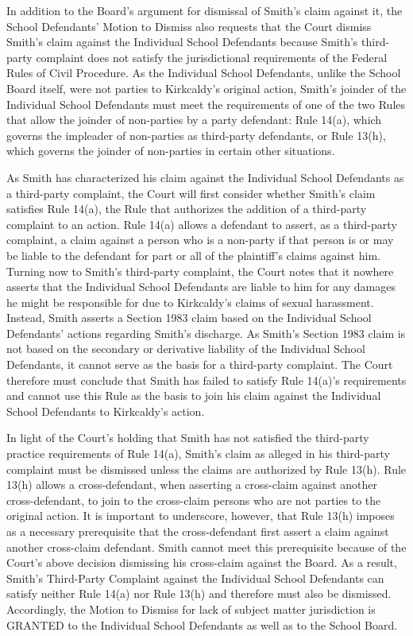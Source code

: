 \documentclass[11pt,letterpaper,twoside]{article}
\begin{document}
In addition to the Board's argument for dismissal of Smith's claim
against it, the School Defendants' Motion to Dismiss also requests that
the Court dismiss Smith's claim against the Individual School Defendants
because Smith's third-party complaint does not satisfy the
jurisdictional requirements of the Federal Rules of Civil Procedure. As
the Individual School Defendants, unlike the School Board itself, were
not parties to Kirkcaldy's original action, Smith's joinder of the
Individual School Defendants must meet the requirements of one of the
two Rules that allow the joinder of non-parties by a party defendant:
Rule 14(a), which governs the impleader of non-parties as third-party
defendants, or Rule 13(h), which governs the joinder of non-parties in
certain other situations.

As Smith has characterized his claim against the Individual School
Defendants as a third-party complaint, the Court will first consider
whether Smith's claim satisfies Rule 14(a), the Rule that authorizes the
addition of a third-party complaint to an action. Rule 14(a) allows a
defendant to assert, as a third-party complaint, a claim against a
person who is a non-party if that person is or may be liable to the
defendant for part or all of the plaintiff's claims against him. Turning
now to Smith's third-party complaint, the Court notes that it nowhere
asserts that the Individual School Defendants are liable to him for any
damages he might be responsible for due to Kirkcaldy's claims of sexual
harassment. Instead, Smith asserts a Section 1983 claim based on the
Individual School Defendants' actions regarding Smith's discharge. As
Smith's Section 1983 claim is not based on the secondary or derivative
liability of the Individual School Defendants, it cannot serve as the
basis for a third-party complaint. The Court therefore must conclude
that Smith has failed to satisfy Rule 14(a)'s requirements and cannot
use this Rule as the basis to join his claim against the Individual
School Defendants to Kirkcaldy's action.

In light of the Court's holding that Smith has not satisfied the
third-party practice requirements of Rule 14(a), Smith's claim as
alleged in his third-party complaint must be dismissed unless the claims
are authorized by Rule 13(h). Rule 13(h) allows a cross-defendant, when
asserting a cross-claim against another cross-defendant, to join to the
cross-claim persons who are not parties to the original action. It is
important to underscore, however, that Rule 13(h) imposes as a necessary
prerequisite that the cross-defendant first assert a claim against
another cross-claim defendant. Smith cannot meet this prerequisite
because of the Court's above decision dismissing his cross-claim against
the Board. As a result, Smith's Third-Party Complaint against the
Individual School Defendants can satisfy neither Rule 14(a) nor Rule
13(h) and therefore must also be dismissed. Accordingly, the Motion to
Dismiss for lack of subject matter jurisdiction is GRANTED to the
Individual School Defendants as well as to the School Board.
\end{document}

